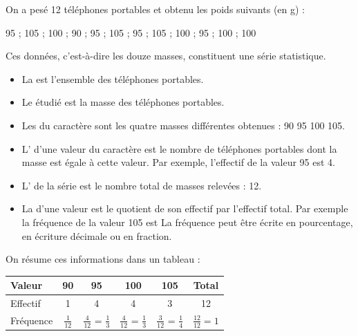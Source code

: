 \documentclass[12pt,a4paper]{article}
\begin{document}
\begin{myex}
	On a pesé 12 téléphones portables et obtenu les poids suivants (en g) :
	
	\begin{center}
		95 ; 105 ; 100 ; 90 ; 95 ; 105 ; 95 ; 105 ; 100 ; 95 ; 100 ; 100
	\end{center}
	
	
	
	Ces données, c’est-à-dire les douze masses, constituent une série statistique.
	\begin{itemize}
		\item La  est l'ensemble des téléphones portables.
		\item Le  étudié est la masse des téléphones portables.
		\item Les  du caractère sont les quatre masses différentes obtenues : 90 95 100 105.
		\item L’ d'une valeur du caractère est le nombre de téléphones portables dont la masse est égale à cette valeur. Par exemple, l'effectif de la valeur 95 est 4.	
		\item 	L’ de la série est le nombre total de masses relevées : 12.
		
		\item La  d'une valeur est le quotient de son effectif par l'effectif total. Par exemple la fréquence de la valeur 105 est La fréquence peut être écrite en pourcentage, en écriture décimale ou en fraction.
	\end{itemize}
	
	
	On résume ces informations dans un tableau :
	
	\vspace*{0.5cm}
	\begin{center}
		
	
		\begin{tabular}{|@{\ }l@{\ }|@{\ }c@{\ }|@{\ }c@{\ }|@{\ }c@{\ }|@{\ }c@{\ }|@{\ }c@{\ }|}
			\hline
			Valeur               & 90             & 95                             & 100                            & 105                            & Total             \\ \hline
			Effectif             & 1              & 4                              & 4                              & 3                              & 12                \\ \hline
			Fréquence & $\frac{1}{12}$ & $\frac{4}{12}$ = $\frac{1}{3}$ & $\frac{4}{12}$ = $\frac{1}{3}$ & $\frac{3}{12}$ = $\frac{1}{4}$ & $\frac{12}{12}=1$ \\ \hline
		\end{tabular}
	\end{center}
	
\end{myex}
\end{document}
